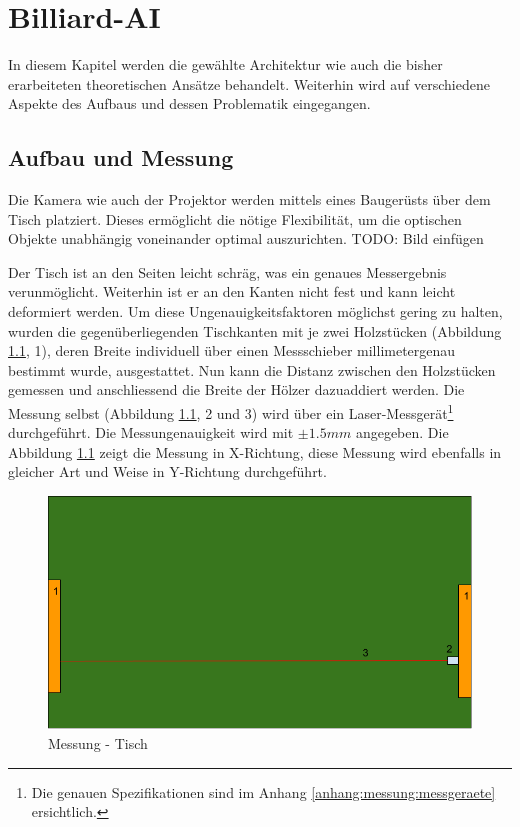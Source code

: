 \chapter{Billiard-AI}
In diesem Kapitel werden die gewählte Architektur wie auch die bisher erarbeiteten theoretischen Ansätze behandelt.
Weiterhin wird auf verschiedene Aspekte des Aufbaus und dessen Problematik eingegangen.





\section{Aufbau und Messung}\label{kap:aufbauMessung}
Die Kamera wie auch der Projektor werden mittels eines Baugerüsts über dem Tisch platziert. Dieses ermöglicht die nötige
Flexibilität, um die optischen Objekte unabhängig voneinander optimal auszurichten.
TODO: Bild einfügen

Der Tisch ist an den Seiten leicht schräg, was ein genaues Messergebnis verunmöglicht. Weiterhin ist er an den Kanten
nicht fest und kann leicht deformiert werden. Um diese Ungenauigkeitsfaktoren möglichst gering zu halten, wurden die
gegenüberliegenden Tischkanten mit je zwei Holzstücken (Abbildung \ref{fig:messung:tisch}, 1), deren Breite individuell
über einen Messschieber millimetergenau bestimmt wurde, ausgestattet. Nun kann die Distanz zwischen den Holzstücken
gemessen und anschliessend die Breite der Hölzer dazuaddiert werden. Die Messung selbst (Abbildung \ref{fig:messung:tisch}, 2 und 3)
wird über ein Laser-Messgerät\footnote{Die genauen Spezifikationen sind im Anhang \ref{anhang:messung:messgeraete} ersichtlich.}
durchgeführt. Die Messungenauigkeit wird mit $\pm 1.5mm$ angegeben. Die Abbildung \ref{fig:messung:tisch} zeigt die Messung in X-Richtung,
diese Messung wird ebenfalls in gleicher Art und Weise in Y-Richtung durchgeführt.
\begin{figure}[h!]
    \begin{center}
        \includegraphics[width=0.8\linewidth]{../common/03_billiard_ai/resources/01_messung_tisch.png}
    \end{center}
    \caption{Messung - Tisch}
    \label{fig:messung:tisch}
\end{figure}


